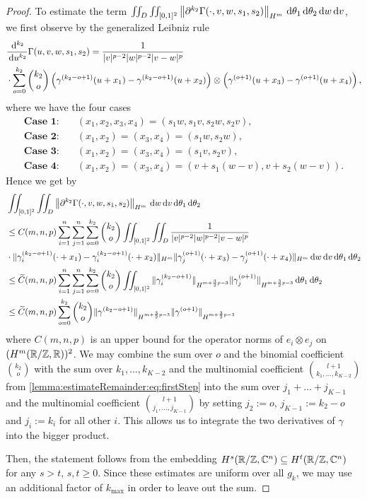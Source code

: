 \begin{proof}
	To estimate the term $\iint_D \iint_{[0,1]^2} \left\| \partial^{k_2} \Gamma(\cdot,v,w,s_1,s_2) \right\|_{H^m} \,\mathrm{d} \theta_1 \,\mathrm{d} \theta_2 \,\mathrm{d} w \,\mathrm{d} v$, we first observe by the generalized Leibniz rule
	\[
	\begin{split}
		& \frac {\,\mathrm{d}^{k_2}} {\,\mathrm{d} u^{k_2}} \Gamma(u,v,w,s_1,s_2)  = \frac{1}{|v|^{p-2}|w|^{p-2}|v-w|^{p}} \\
		& \cdot \sum_{o=0}^{k_2} \binom{k_2}{o} \left(\gamma^{(k_2-o+1)}(u+x_1) - \gamma^{(k_2-o+1)}(u+x_2) \right) \otimes \left( \gamma^{(o+1)}(u+x_3) - \gamma^{(o+1)}(u+x_4) \right),
	\end{split}
	\]
	where we have the four cases 
	\[
	\begin{split}
	\textbf{Case 1:} & \quad (x_1,x_2,x_3,x_4) =(s_1w,s_1v, s_2w, s_2v), \\
	\textbf{Case 2:} & \quad (x_1,x_2)=(x_3,x_4) = (s_1w,s_2w), \\
	\textbf{Case 3:} & \quad (x_1,x_2)=(x_3,x_4) = (s_1v, s_2v), \\
	\textbf{Case 4:} & \quad (x_1,x_2)=(x_3,x_4) = (v+s_1(w-v), v+s_2(w-v)).
	\end{split}
	\]
	Hence we get by  
	\[
	\begin{split}
	&\iint_{[0,1]^2} \iint_D  \left\| \partial^{k_2} \Gamma(\cdot,v,w,s_1,s_2) \right\|_{H^m}  \d w \d v \d \theta_1 \d \theta_2  \\
	& \leq C(m,n,p) \sum_{i=1}^n \sum_{j=1}^n \sum_{o=0}^{k_2} \binom{k_2}{o} \iint_{[0,1]^2} \iint_D  \frac{1}{|v|^{p-2}|w|^{p-2}|v-w|^{p}} \\
	& \cdot \norm[H^m]{\gamma_i^{(k_2-o+1)}(\cdot +x_1) - \gamma_i^{(k_2-o+1)}(\cdot +x_2)} \norm[H^m]{\gamma_j^{(o+1)}(\cdot+x_3) - \gamma_j^{(o+1)}(\cdot +x_4)} \d w \d v \d \theta_1 \d \theta_2\\
	& \leq \widetilde C(m,n,p) \sum_{i=1}^n \sum_{j=1}^n \sum_{o=0}^{k_2} \binom{k_2}{o} \iint_{[0,1]^2} \| \gamma_i^{(k_2-o+1)}\|_{H^{m+ \frac 32 p -3}} \|\gamma_j^{(o+1)}\|_{H^{m+ \frac 32 p -3 }}  \d \theta_1 \d \theta_2 \\
	& \leq \widetilde C(m,n,p) \sum_{o=0}^{k_2} \binom{k_2}{o} \| \gamma^{(k_2-o+1)}\|_{H^{m+ \frac 32 p -3}} \|\gamma^{(o+1)}\|_{H^{m+ \frac 32 p -3 }}
	\end{split}
	\]
    where $C(m,n,p)$ is an upper bound for the operator norms of $e_i\otimes e_j$ on $(H^m(\mathbb{R}/\mathbb{Z},\mathbb{R}))^2$.
    We may combine the sum over $o$ and the binomial coefficient $\binom{k_2}{o}$ with the sum over $k_1, \ldots, k_{K-2}$ and the multinomial coefficient $\binom{l+1}{k_1,\ldots,k_{K-2}}$ from \eqref{lemma:estimateRemainder:eq:firstStep} into the sum over $j_1 + \ldots + j_{K-1}$ and the multinomial coefficient $\binom{l+1}{j_1, \ldots, j_{K-1}}$ by setting $j_2 := o$, $j_{K-1} := k_2-o$ and $j_i := k_i$ for all other $i$.
    This allows us to integrate the two derivatives of $\gamma$ into the bigger product.
    
    Then, the
	statement follows from the embedding $H^s(\mathbb{R}/\mathbb{Z},\mathbb{C}^n) \subseteq H^t(\mathbb{R}/\mathbb{Z},\mathbb{C}^n)$ for any $s>t$, $s,t \geq 0$. 
    Since these estimates are uniform over all $g_k$, we may use an additional factor of $k_{\max}$ in order to leave out the sum.
\end{proof}
